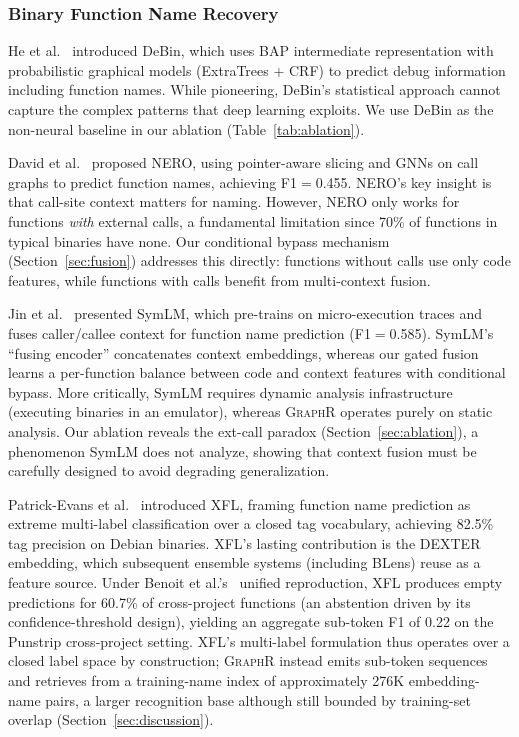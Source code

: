 \documentclass[sigconf,nonacm]{acmart}
\newcommand{\sysname}{\textsc{GraphR}}
\begin{document}
\subsubsection{Binary Function Name Recovery}

He et al.~\cite{debin} introduced DeBin, which uses BAP intermediate representation with probabilistic graphical models (ExtraTrees + CRF) to predict debug information including function names. While pioneering, DeBin's statistical approach cannot capture the complex patterns that deep learning exploits. We use DeBin as the non-neural baseline in our ablation (Table~\ref{tab:ablation}).

David et al.~\cite{nero} proposed NERO, using pointer-aware slicing and GNNs on call graphs to predict function names, achieving F1$=$0.455. NERO's key insight is that call-site context matters for naming. However, NERO only works for functions \emph{with} external calls, a fundamental limitation since 70\% of functions in typical binaries have none. Our conditional bypass mechanism (Section~\ref{sec:fusion}) addresses this directly: functions without calls use only code features, while functions with calls benefit from multi-context fusion.

Jin et al.~\cite{symlm} presented SymLM, which pre-trains on micro-execution traces and fuses caller/callee context for function name prediction (F1$=$0.585). SymLM's ``fusing encoder'' concatenates context embeddings, whereas our gated fusion learns a per-function balance between code and context features with conditional bypass. More critically, SymLM requires dynamic analysis infrastructure (executing binaries in an emulator), whereas \sysname{} operates purely on static analysis. Our ablation reveals the ext-call paradox (Section~\ref{sec:ablation}), a phenomenon SymLM does not analyze, showing that context fusion must be carefully designed to avoid degrading generalization.

Patrick-Evans et al.~\cite{xfl} introduced XFL, framing function name prediction as extreme multi-label classification over a closed tag vocabulary, achieving 82.5\% tag precision on Debian binaries. XFL's lasting contribution is the DEXTER embedding, which subsequent ensemble systems (including BLens) reuse as a feature source. Under Benoit et al.'s~\cite{blens} unified reproduction, XFL produces empty predictions for 60.7\% of cross-project functions (an abstention driven by its confidence-threshold design), yielding an aggregate sub-token F1 of 0.22 on the Punstrip cross-project setting. XFL's multi-label formulation thus operates over a closed label space by construction; \sysname{} instead emits sub-token sequences and retrieves from a training-name index of approximately 276K embedding-name pairs, a larger recognition base although still bounded by training-set overlap (Section~\ref{sec:discussion}).
\end{document}
